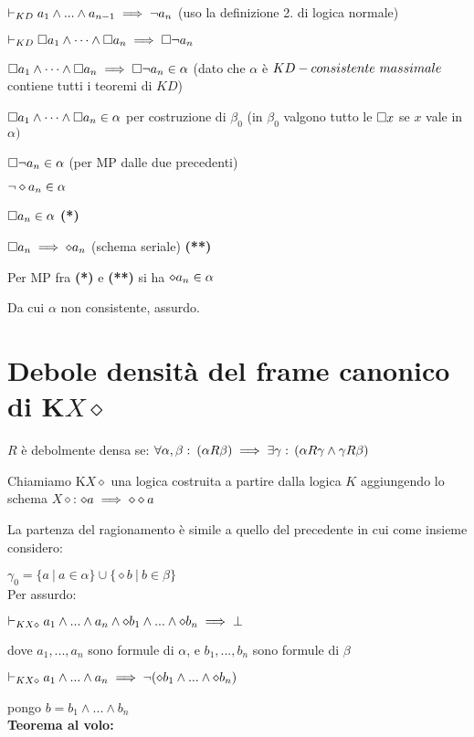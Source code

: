 $\vdash_{KD}a_{1}\wedge...\wedge a_{n-1}\implies\neg a_{n}$ (uso la definizione
2. di logica normale)

$\vdash_{KD}\square a_{1}\wedge\dots\wedge\square a_{n}\implies\square\neg a_{n}$ 

$\square a_{1}\wedge\dots\wedge\square a_{n}\implies\square\neg a_{n}\in\alpha$ (dato che $\alpha$
è $KD-consistente\ massimale$ contiene tutti i teoremi di $KD$)

$\square a_{1}\wedge\dots\wedge\square a_{n}\in\alpha$ per costruzione di $\beta_{0}$ (in $\beta_{0}$
valgono tutto le $\square x$ se $x$ vale in $\alpha)$

$\square\neg a_{n}\in\alpha$ (per MP dalle due precedenti)

$\neg\diamond a_{n}\in\alpha$

$\square a_{n}\in\alpha$ \textbf{({*})}

$\square a_{n}\implies\diamond a_{n}$ (schema seriale) \textbf{({*}{*})}

Per MP fra \textbf{({*}) }e\textbf{ ({*}{*}) }si ha $\diamond a_{n}\in\alpha$ 

Da cui $\alpha$ non consistente, assurdo. \lightning


\section{Debole densità del frame canonico di K$X\diamond$}

$R$ è debolmente densa se: $\forall\alpha,\beta:\:(\alpha R\beta)\implies\exists\gamma:\,(\alpha R\gamma\wedge\gamma R\beta)$

Chiamiamo K$X\diamond$ una logica costruita a partire dalla logica
$K$ aggiungendo lo schema $X\diamond$: $\diamond a\implies\diamond\diamond a$ 

La partenza del ragionamento è simile a quello del precedente in cui
come insieme considero:

$\gamma_{0}=\{a\ |\ a\in\alpha\}\cup\{\diamond b\ |\ b\in\beta\}$\\


Per assurdo:

$\vdash_{KX\diamond}a_{1}\wedge...\wedge a_{n}\wedge\diamond b_{1}\wedge...\wedge\diamond b_{n}\implies\bot$

dove $a_{1},...,a_{n}$ sono formule di $\alpha$, e $b_{1},...,b_{n}$
sono formule di $\beta$

$\vdash_{KX\diamond}a_{1}\wedge...\wedge a_{n}\implies\neg(\diamond b_{1}\wedge...\wedge\diamond b_{n})$

pongo $b=b_{1}\wedge...\wedge b_{n}$\\


\textbf{Teorema al volo:}

